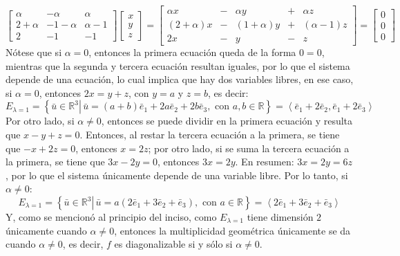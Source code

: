\begin{solucion}
\begin{enumerate}[$a$)]
  \begin{equation*}
   \begin{bmatrix}
    \alpha     &   -  \alpha & \alpha     \\
    2 + \alpha & -1 - \alpha & \alpha - 1 \\
    2 & -1 & -1 
   \end{bmatrix}
   \begin{bmatrix}
    x \\ y \\ z
   \end{bmatrix}
   = 
   \begin{bmatrix}
    \alpha x & - &\alpha y & + & \alpha z \\
    (2+\alpha)x & - & (1+\alpha)y & + & (\alpha-1)z \\
    2x & - & y & - & z
   \end{bmatrix}
   = 
   \begin{bmatrix}
    0 \\ 0 \\ 0
   \end{bmatrix}
  \end{equation*}
  N\'otese que si $\alpha = 0$, entonces la primera ecuaci\'on queda de la forma $0 = 0$, mientras que la segunda y tercera ecuaci\'on resultan iguales, por lo que el sistema depende de una ecuaci\'on, lo cual implica que hay dos variables libres, en ese caso, si $\alpha = 0$, entonces $2x = y + z$, con $y = a$ y $z=b$, es decir:
  \begin{equation*}
   E_{\lambda=1} = \left\{ \left. \bar{u} \in \mathbb{R}^3 \right| \, \bar{u} = (a+b)\bar{e}_1 + 2a\bar{e}_2 + 2b\bar{e}_3, \text{ con } a,b\in\mathbb{R} \right\} = \left< \bar{e}_1 + 2\bar{e}_2, \bar{e}_1 + 2\bar{e}_3\right>
  \end{equation*}
  Por otro lado, si $\alpha \neq 0$, entonces se puede dividir en la primera ecuaci\'on y resulta que $x - y + z = 0$.
  Entonces, al restar la tercera ecuaci\'on a la primera, se tiene que $-x + 2z = 0$, entonces $x = 2z$; por otro lado, si se suma la tercera ecuaci\'on a la primera, se tiene que $3x - 2y = 0$, entonces $3x = 2y$. En resumen: $3x = 2y = 6z$, por lo que el sistema \'unicamente depende de una variable libre. Por lo tanto, si $\alpha \neq 0$:
  \begin{equation*}
   E_{\lambda = 1} = \left\{ \left. \bar{u} \in \mathbb{R}^3 \right| \, \bar{u} = a(2\bar{e}_1 + 3\bar{e}_2 + \bar{e}_3), \text{ con } a\in\mathbb{R} \right\} = \left< 2\bar{e}_1 + 3\bar{e}_2 + \bar{e}_3 \right>
  \end{equation*}
  Y, como se mencion\'o al principio del inciso, como $E_{\lambda=1}$ tiene dimensi\'on $2$ \'unicamente cuando $\alpha \neq 0$, entonces la multiplicidad geom\'etrica \'unicamente se da cuando $\alpha \neq 0$, es decir, $f$ es diagonalizable si y s\'olo si $\alpha \neq 0$.
  

\end{enumerate}
\end{solucion}
